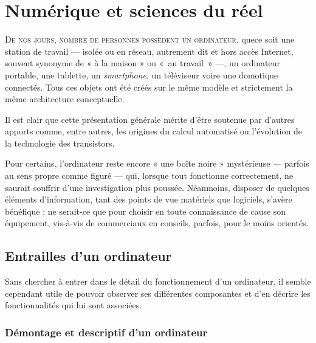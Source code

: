 \chapter[Numérique et sciences du réel]{Numérique et sciences du réel}
\label{chap:I}

\lettrine{D}{e nos jours, nombre de personnes possèdent un ordinateur}, que\linebreak ce soit
une station de travail --- isolée ou en réseau, autrement dit et hors accès Internet, souvent synonyme de « à la maison » ou «~au tra\-vail~» ---, un ordinateur portable, une tablette, un \textit{smartphone}, un téléviseur voire une domotique connectés. Tous ces objets ont été créés sur le même modèle et strictement la même architecture conceptuelle.
\parnotes
\vspace*{1pt}

Il est clair que cette présentation générale mérite d'être soutenue par d'autres apports comme, entre autres, les origines du calcul automatisé ou l'évolution de la technologie des transistors. %

Pour certains, l'ordinateur reste encore « une boîte noire » mystérieuse --- parfois au sens propre comme figuré --- qui, lorsque tout fonctionne correctement, ne saurait souffrir d'une investigation plus poussée.
Néanmoins, disposer de quelques éléments d'information, tant des points de vue matériels que logiciels, s'avère bénéfique ; ne serait-ce que pour choisir en toute connaissance de cause son équipement, vis-à-vis de commerciaux en conseils, parfois, pour le moins orientés.

\vspace*{-0.5pt}
\section[Entrailles d'un ordinateur]{Entrailles d'un ordinateur}
\label{sec:I.1}

Sans chercher à entrer dans le détail du fonctionnement d'un ordinateur, il semble cependant utile de pouvoir observer ses différentes composantes et d'en décrire les fonctionnalités qui lui sont associées.

\vspace*{-0.5pt}
\subsection[Démontage et descriptif]{Démontage et descriptif d'un ordinateur}
\label{sub:I.1.1}

